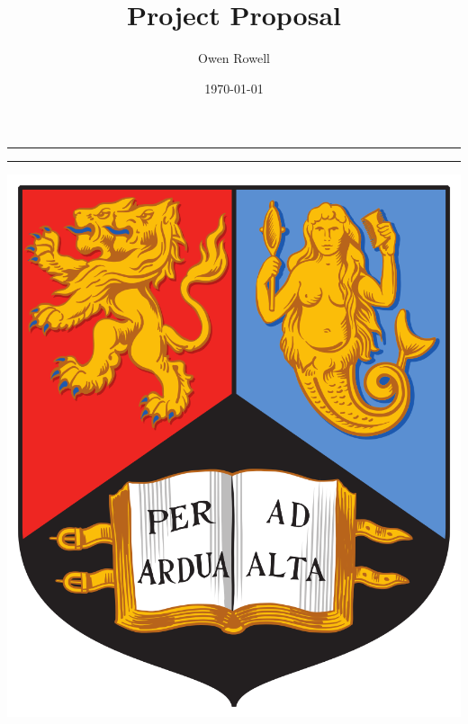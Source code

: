\documentclass{article}
\title{Project Proposal}
\author{Owen Rowell}
\date{\today}
\numberwithin{equation}{section}
\begin{document}
\maketitle											%
\vspace{-112px}										%
\noindent\rule{\linewidth}{1pt} \par				%
\vspace{100px}										%
\vspace{-20px}										%
\noindent\rule{\linewidth}{1pt} \par				%
\vspace{10px}										%
\vspace{-85px}										%
\noindent											%
\begin{minipage}{0.5\textwidth}\begin{flushleft}	%
\hspace{20px}										%
\includegraphics[scale = 0.06]{Resources/UoB}		%
\end{flushleft}\end{minipage}						%
\end{document}
